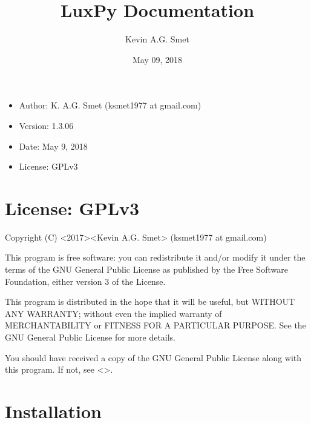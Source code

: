 \documentclass[letterpaper,10pt,english]{sphinxmanual}
\title{LuxPy Documentation}
\date{May 09, 2018}
\author{Kevin A.G. Smet}
\begin{document}
\maketitle
\sphinxtableofcontents
{}\label{\detokenize{index::doc}}

\begin{itemize}
\item {} 
Author: K. A.G. Smet (ksmet1977 at gmail.com)

\item {} 
Version: 1.3.06

\item {} 
Date: May 9, 2018

\item {} 
License: GPLv3

\end{itemize}

\noindent{}


\chapter{License: GPLv3}
\label{\detokenize{license:license-gplv3}}\label{\detokenize{license:luxpy-a-package-for-lighting-and-color-science}}\label{\detokenize{license::doc}}
Copyright (C) \textless{}2017\textgreater{}\textless{}Kevin A.G. Smet\textgreater{} (ksmet1977 at gmail.com)

This program is free software: you can redistribute it and/or modify
it under the terms of the GNU General Public License as published by
the Free Software Foundation, either version 3 of the License.

This program is distributed in the hope that it will be useful,
but WITHOUT ANY WARRANTY; without even the implied warranty of
MERCHANTABILITY or FITNESS FOR A PARTICULAR PURPOSE.  See the
GNU General Public License for more details.

You should have received a copy of the GNU General Public License
along with this program. If not, see \textless{}\textgreater{}.


\chapter{Installation}
\label{\detokenize{installation:installation}}\label{\detokenize{installation::doc}}
\end{document}
